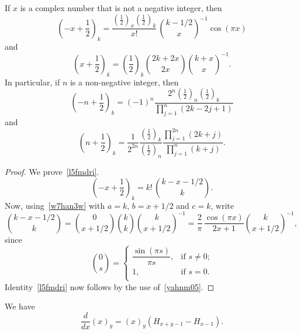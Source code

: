 \documentclass[12pt,reqno]{article}
\begin{document}
\begin{lemma}\label{w00yljy}
If $x$ is a complex number that is not a negative integer, then
\begin{equation}\label{l5fmdri}
\left( { - x + \frac{1}{2}} \right)_k  = \frac{{\left( {\frac{1}{2}} \right)_x \left( {\frac{1}{2}} \right)_k }}{{x!}}\,\binom{{k - 1/2}}{x}^{ - 1} \cos \left( \pi x \right)
\end{equation}
and
\begin{equation}\label{bjv8z0f}
\left( {x + \frac{1}{2}} \right)_k  = \left( {\frac{1}{2}} \right)_k \binom{{2k + 2x}}{{2x}}\binom{{k + x}}{x}^{ - 1}.
\end{equation}
In particular, if $n$ is a non-negative integer, then
\begin{equation}\label{mq7ny8m}
\left( { - n + \frac{1}{2}} \right)_k  = ( - 1)^n \frac{{2^n \left( {\frac{1}{2}} \right)_n \left( {\frac{1}{2}} \right)_k }}{{\prod_{j = 1}^n {\left( {2k - 2j + 1} \right)} }}
\end{equation}
and
\begin{equation}\label{t0khqm8}
\left( {n + \frac{1}{2}} \right)_k  = \frac{1}{{2^{2n} }}\frac{{\left( {\frac{1}{2}} \right)_k }}{{\left( {\frac{1}{2}} \right)_n }}\frac{{\prod_{j = 1}^{2n} {\left( {2k + j} \right)} }}{{\prod_{j = 1}^n {\left( {k + j} \right)} }}.
\end{equation}
\end{lemma}
\begin{proof}
We prove~\eqref{l5fmdri}.
\begin{equation}
\left( { - x + \frac{1}{2}} \right)_k  = k!\,\binom{{k - x - 1/2}}{k}.
\end{equation}
Now, using~\eqref{w7han3w} with $a=k$, $b=x+1/2$ and $c=k$, write
\begin{equation}
\binom{{k - x - 1/2}}{k} = \binom{{0}}{{x + 1/2}}\binom{{k}}{k}\binom{{k}}{{x + 1/2}}^{ - 1}  = \frac{2}{\pi }\,\frac{{\cos \left( \pi x\right)}}{{2x + 1}}\binom{{k}}{{x + 1/2}}^{ - 1},
\end{equation}
since
\begin{equation}
\binom{{0}}{s}
=\begin{cases}
 \dfrac{{\sin \left( {\pi s} \right)}}{{\pi s}},&\text{if $s\ne0$;} \\ 
 1,&\text{if $s=0$.} \\ 
 \end{cases}
\end{equation}
Identity~\eqref{l5fmdri} now follows by the use of~\eqref{yahnm05}.
\end{proof}
\begin{lemma}
We have
\begin{equation}
\frac{d}{{dx}}\left( x \right)_y  = \left( x \right)_y \left( {H_{x + y - 1}  - H_{x - 1} } \right).
\end{equation}
\end{lemma}
\end{document}
